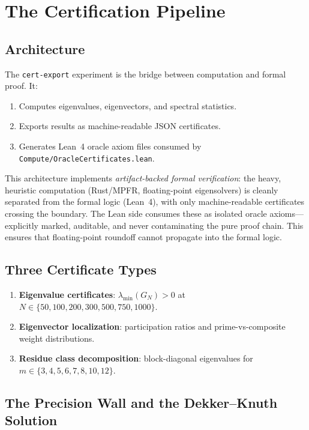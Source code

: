 \documentclass[11pt,a4paper]{article}
\begin{document}
\section{The Certification Pipeline}

\subsection{Architecture}

The \texttt{cert-export} experiment is the bridge between
computation and formal proof. It:
\begin{enumerate}
  \item Computes eigenvalues, eigenvectors, and spectral statistics.
  \item Exports results as machine-readable JSON certificates.
  \item Generates Lean~4 oracle axiom files consumed by
    \texttt{Compute/OracleCertificates.lean}.
\end{enumerate}

This architecture implements \emph{artifact-backed formal verification}:
the heavy, heuristic computation (Rust/MPFR, floating-point eigensolvers)
is cleanly separated from the formal logic (Lean~4), with only
machine-readable certificates crossing the boundary. The Lean side
consumes these as isolated oracle axioms---explicitly marked, auditable,
and never contaminating the pure proof chain. This ensures that
floating-point roundoff cannot propagate into the formal logic.

\subsection{Three Certificate Types}

\begin{enumerate}
  \item \textbf{Eigenvalue certificates}: $\lambda_{\min}(G_N) > 0$
    at $N \in \{50, 100, 200, 300, 500, 750, 1000\}$.
  \item \textbf{Eigenvector localization}: participation ratios
    and prime-vs-composite weight distributions.
  \item \textbf{Residue class decomposition}: block-diagonal
    eigenvalues for $m \in \{3,4,5,6,7,8,10,12\}$.
\end{enumerate}

\subsection{The Precision Wall and the Dekker--Knuth Solution}
\end{document}
